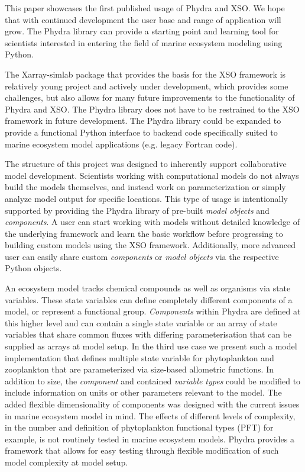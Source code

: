 \documentclass[journal abbreviation, manuscript]{copernicus}
\begin{document}
This paper showcases the first published usage of Phydra and XSO. We hope that with continued development the user base and range of application will grow. The Phydra library can provide a starting point and learning tool for scientists interested in entering the field of marine ecosystem modeling using Python.

The Xarray-simlab package that provides the basis for the XSO framework is relatively young project and actively under development, which provides some challenges, but also allows for many future improvements to the functionality of Phydra and XSO. The Phydra library does not have to be restrained to the XSO framework in future development. The Phydra library could be expanded to provide a functional Python interface to backend code specifically suited to marine ecosystem model applications (e.g. legacy Fortran code).

The structure of this project was designed to inherently support collaborative model development. Scientists working with computational models do not always build the models themselves, and instead work on parameterization or simply analyze model output for specific locations. This type of usage is intentionally supported by providing the Phydra library of pre-built \textit{model objects} and \textit{components}. A user can start working with models without detailed knowledge of the underlying framework and learn the basic workflow before progressing to building custom models using the XSO framework. Additionally, more advanced user can easily share custom \textit{components} or \textit{model objects} via the respective Python objects.

An ecosystem model tracks chemical compounds as well as organisms via state variables. These state variables can define completely different components of a model, or represent a functional group. \textit{Components} within Phydra are defined at this higher level and can contain a single state variable or an array of state variables that share common fluxes with differing parameterisation that can be supplied as arrays at model setup. In the third use case we present such a model implementation that defines multiple state variable for phytoplankton and zooplankton that are parameterized via size-based allometric functions. In addition to size, the \textit{component} and contained \textit{variable types} could be modified to include information on units or other parameters relevant to the model. The added flexible dimensionality of components was designed with the current issues in marine ecosystem model in mind. The effects of different levels of complexity, in the number and definition of phytoplankton functional types (PFT) for example, is not routinely tested in marine ecosystem models. Phydra provides a framework that allows for easy testing through flexible modification of such model complexity at model setup.
\end{document}
